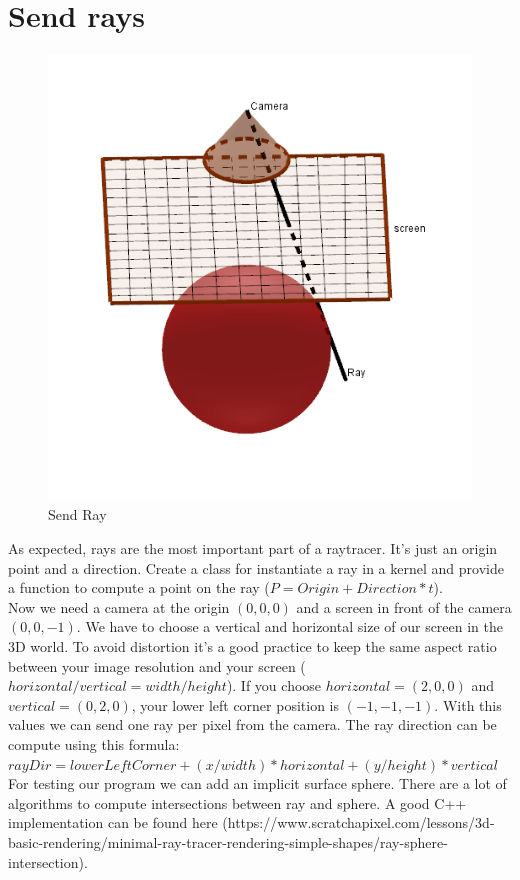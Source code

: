 \documentclass{article}
\begin{document}
\section{Send rays}
\begin{figure}[h]
	\centering
	\includegraphics[scale=0.5]{figure/sendray.png}
	\caption{Send Ray}
\end{figure}
As expected, rays are the most important part of a raytracer. It's just an origin point and a direction. Create a class for instantiate a ray in a kernel and provide a function to compute a point on the ray ($P = Origin + Direction*t$).\\
Now we need a camera at the origin $(0, 0, 0)$ and a screen in front of the camera $(0, 0, -1)$. We have to choose a vertical and horizontal size of our screen in the 3D world. To avoid distortion it's a good practice to keep the same aspect ratio between your image resolution and your screen ($horizontal/vertical = width/height$). If you choose $horizontal = (2, 0, 0)$ and $vertical = (0, 2, 0)$, your lower left corner position is $(-1, -1, -1)$. With this values we can send one ray per pixel from the camera. The ray direction can be compute using this formula: $rayDir = lowerLeftCorner + (x/width)*horizontal + (y/height)*vertical$\\
For testing our program we can add an implicit surface sphere. There are a lot of algorithms to compute intersections between ray and sphere. A good C++ implementation can be found here (https://www.scratchapixel.com/lessons/3d-basic-rendering/minimal-ray-tracer-rendering-simple-shapes/ray-sphere-intersection).
\end{document}
